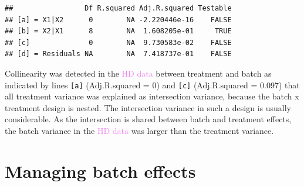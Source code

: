 \documentclass[
]{book}
\newenvironment{Shaded}{\begin{snugshade}}{\end{snugshade}}
\newcommand{\AttributeTok}[1]{\textcolor[rgb]{0.77,0.63,0.00}{#1}}
\newcommand{\CommentTok}[1]{\textcolor[rgb]{0.56,0.35,0.01}{\textit{#1}}}
\newcommand{\ConstantTok}[1]{\textcolor[rgb]{0.00,0.00,0.00}{#1}}
\newcommand{\FunctionTok}[1]{\textcolor[rgb]{0.00,0.00,0.00}{#1}}
\newcommand{\NormalTok}[1]{#1}
\newcommand{\OtherTok}[1]{\textcolor[rgb]{0.56,0.35,0.01}{#1}}
\newcommand{\SpecialCharTok}[1]{\textcolor[rgb]{0.00,0.00,0.00}{#1}}
\newcommand{\StringTok}[1]{\textcolor[rgb]{0.31,0.60,0.02}{#1}}
\begin{document}
\begin{Shaded}
\end{Shaded}

\begin{verbatim}
##                 Df R.squared Adj.R.squared Testable
## [a] = X1|X2      0        NA -2.220446e-16    FALSE
## [b] = X2|X1      8        NA  1.608205e-01     TRUE
## [c]              0        NA  9.730583e-02    FALSE
## [d] = Residuals NA        NA  7.418737e-01    FALSE
\end{verbatim}

Collinearity was detected in the \textcolor{violet}{HD data} between treatment and batch as indicated by lines \texttt{{[}a{]}} (Adj.R.squared = 0) and \texttt{{[}c{]}} (Adj.R.squared = 0.097) that all treatment variance was explained as intersection variance, because the batch x treatment design is nested. The intersection variance in such a design is usually considerable. As the intersection is shared between batch and treatment effects, the batch variance in the \textcolor{violet}{HD data} was larger than the treatment variance.

\hypertarget{managing-batch-effects}{%
\section{Managing batch effects}\label{managing-batch-effects}}
\end{document}
